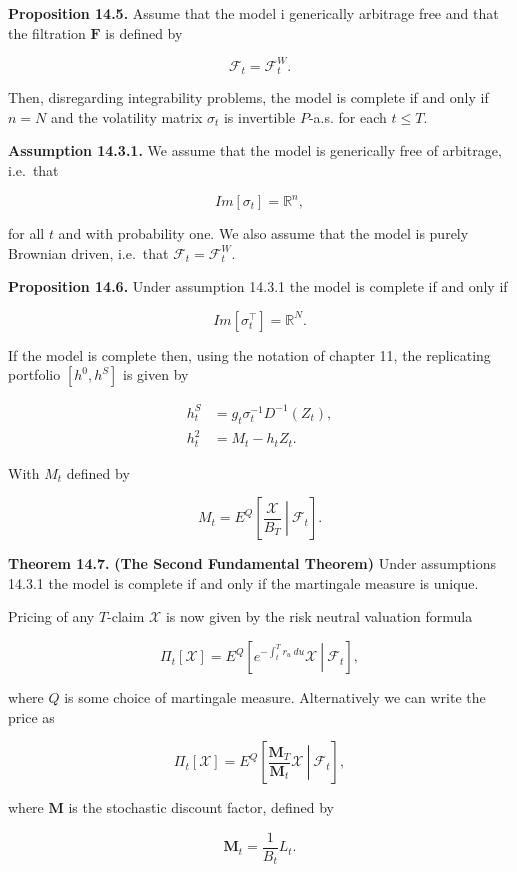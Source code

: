 \documentclass[
]{article}
\begin{document}
\textbf{Proposition 14.5.} Assume that the model i generically arbitrage
free and that the filtration \(\mathbf{F}\) is defined by

\[
\mathcal{F}_t=\mathcal{F}^W_t.
\]

Then, disregarding integrability problems, the model is complete if and
only if \(n=N\) and the volatility matrix \(\sigma_t\) is invertible
\(P\)-a.s. for each \(t\le T\).

\textbf{Assumption 14.3.1.} We assume that the model is generically free
of arbitrage, i.e.~that

\[
Im[\sigma_t]=\mathbb{R}^n,
\]

for all \(t\) and with probability one. We also assume that the model is
purely Brownian driven, i.e.~that \(\mathcal{F}_t=\mathcal{F}_t^W\).

\textbf{Proposition 14.6.} Under assumption 14.3.1 the model is complete
if and only if

\[
Im[\sigma_t^\top]=\mathbb{R}^N.
\]

If the model is complete then, using the notation of chapter 11, the
replicating portfolio \([h^0,h^S]\) is given by

\begin{align*}
h_t^S&=g_t\sigma_t^{-1}D^{-1}(Z_t),\\
h_t^2&=M_t-h_tZ_t.
\end{align*}

With \(M_t\) defined by

\[
M_t=E^Q\left[\left. \frac{\mathcal{X}}{B_T}\ \right\vert\ \mathcal{F}_t \right].
\]

\textbf{Theorem 14.7.} \textbf{(The Second Fundamental Theorem)} Under
assumptions 14.3.1 the model is complete if and only if the martingale
measure is unique.

Pricing of any \(T\)-claim \(\mathcal{X}\) is now given by the risk
neutral valuation formula

\[
\Pi_t[\mathcal{X}] = E^Q\left[\left. e^{-\int_t^Tr_u\ du}\mathcal{X} \ \right\vert\ \mathcal{F}_t\right],
\]

where \(Q\) is some choice of martingale measure. Alternatively we can
write the price as

\[
\Pi_t[\mathcal{X}] = E^Q\left[\left. \frac{\mathbf{M}_T}{\mathbf{M}_t}\mathcal{X} \ \right\vert\ \mathcal{F}_t\right],
\]

where \(\mathbf{M}\) is the stochastic discount factor, defined by

\[
\mathbf{M}_t=\frac{1}{B_t}L_t.
\]
\end{document}
